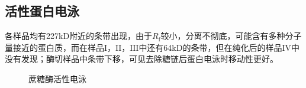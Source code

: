 \subsection{活性蛋白电泳}
\par 各样品均有227kD附近的条带出现，由于$R_\text{f}$较小，分离不彻底，可能含有多种分子量接近的蛋白质，而在样品$\mathrm{I，II，III}$中还有64kD的条带，但在纯化后的样品$\mathrm{IV}$中没有发现；酶切样品中条带下移，可见去除糖链后蛋白电泳时移动性更好。

\begin{figure}
    \caption{蔗糖酶活性电泳}
    \label{fig:AC}
\end{figure}


